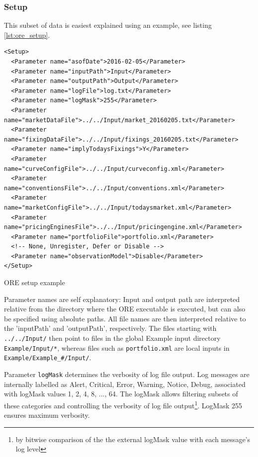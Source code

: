 \documentclass[12pt, a4paper]{article}
\begin{document}
\subsubsection{Setup}

This subset of data is easiest explained using an example, see listing \ref{lst:ore_setup}.
\begin{listing}[H]
\begin{verbatim}
<Setup>
  <Parameter name="asofDate">2016-02-05</Parameter>
  <Parameter name="inputPath">Input</Parameter>
  <Parameter name="outputPath">Output</Parameter>
  <Parameter name="logFile">log.txt</Parameter>
  <Parameter name="logMask">255</Parameter>
  <Parameter name="marketDataFile">../../Input/market_20160205.txt</Parameter>
  <Parameter name="fixingDataFile">../../Input/fixings_20160205.txt</Parameter>
  <Parameter name="implyTodaysFixings">Y</Parameter>
  <Parameter name="curveConfigFile">../../Input/curveconfig.xml</Parameter>
  <Parameter name="conventionsFile">../../Input/conventions.xml</Parameter>
  <Parameter name="marketConfigFile">../../Input/todaysmarket.xml</Parameter>
  <Parameter name="pricingEnginesFile">../../Input/pricingengine.xml</Parameter>
  <Parameter name="portfolioFile">portfolio.xml</Parameter>
  <!-- None, Unregister, Defer or Disable -->
  <Parameter name="observationModel">Disable</Parameter>
</Setup>
\end{verbatim}
\caption{ORE setup example}
\label{lst:ore_setup}
\end{listing}

Parameter names are self explanatory: Input and output path are interpreted relative from the directory where the ORE
executable is executed, but can also be specified using absolute paths. All file names are then interpreted relative to the
'inputPath' and 'outputPath', respectively. The files starting with {\tt ../../Input/} then point to files in the global
Example input directory {\tt Example/Input/*}, whereas files such as {\tt portfolio.xml} are local inputs in {\tt 
Example/Example\_\#/Input/}. 

Parameter {\tt logMask} determines the verbosity of log file output. Log messages are 
internally labelled as Alert, Critical, Error, Warning, Notice, Debug, associated with logMask values 1, 2, 4, 8, ..., 64. 
The logMask allows filtering subsets of these categories and controlling the verbosity of log file output\footnote{by bitwise comparison of the the external logMask value with each message's log level}. LogMask 255 ensures maximum verbosity. \\
\end{document}
